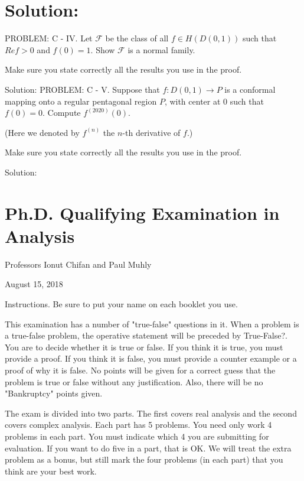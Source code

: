 \documentclass[10pt]{article}
\begin{document}
\section{Solution:}
PROBLEM: C - IV. Let $\mathcal{F}$ be the class of all $f \in H(D(0,1))$ such that $R e f>0$ and $f(0)=1$. Show $\mathcal{F}$ is a normal family.

Make sure you state correctly all the results you use in the proof.

Solution: PROBLEM: C - V. Suppose that $f: D(0,1) \rightarrow P$ is a conformal mapping onto a regular pentagonal region $P$, with center at 0 such that $f(0)=0$. Compute $f^{(2020)}(0)$.

(Here we denoted by $f^{(n)}$ the $n$-th derivative of $f$.)

Make sure you state correctly all the results you use in the proof.

Solution:

\section{Ph.D. Qualifying Examination in Analysis}
Professors Ionut Chifan and Paul Muhly

August 15, 2018

Instructions. Be sure to put your name on each booklet you use.

This examination has a number of "true-false" questions in it. When a problem is a true-false problem, the operative statement will be preceded by True-False?. You are to decide whether it is true or false. If you think it is true, you must provide a proof. If you think it is false, you must provide a counter example or a proof of why it is false. No points will be given for a correct guess that the problem is true or false without any justification. Also, there will be no "Bankruptcy" points given.

The exam is divided into two parts. The first covers real analysis and the second covers complex analysis. Each part has 5 problems. You need only work 4 problems in each part. You must indicate which 4 you are submitting for evaluation. If you want to do five in a part, that is OK. We will treat the extra problem as a bonus, but still mark the four problems (in each part) that you think are your best work.
\end{document}
